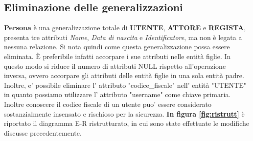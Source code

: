 \documentclass[10pt,a4paper]{article}
\begin{document}
\subsection{Eliminazione delle generalizzazioni}
\textbf {Persona} è una generalizzazione totale di \textbf{UTENTE}, \textbf{ATTORE} e \textbf{REGISTA}, presenta
tre attributi \textit{Nome}, \textit{Data di nascita} e \textit{Identificatore}, ma non è legata a nessuna relazione.
Si nota quindi come questa generalizzazione possa essere eliminata. È preferibile infatti
accorpare i sue attributi nelle entità figlie. In questo modo si riduce il numero di attributi NULL rispetto all'operazione inversa,
ovvero accorpare gli attributi delle entità figlie in una sola entità padre.\newline
Inoltre, e' possibile eliminare l' attributo "codice\_fiscale" nell' entità "UTENTE" in quanto possiamo utilizzare l' attributo "username" come chiave primaria. Inoltre conoscere il codice fiscale di un utente puo' essere considerato sostanzialmente insensato e rischioso per la sicurezza.\newline
\textbf{In figura \ref{fig:ristrutt}} è riportato il diagramma E-R ristrutturato, in cui sono state effettuate le modifiche discusse precedentemente.
\end{document}
